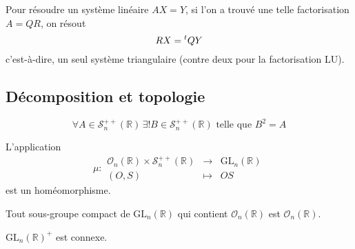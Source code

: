 	
	\begin{remark}
		Pour résoudre un système linéaire $AX = Y$, si l'on a trouvé une telle factorisation $A = QR$, on résout
		\[ RX = \mathstrut ^t QY \]
		c'est-à-dire, un seul système triangulaire (contre deux pour la factorisation LU).
	\end{remark}
	
	\subsection{Décomposition et topologie}
	
	
	\begin{lemma}
		\[ \forall A \in \mathcal{S}_n^{++}(\mathbb{R}) \, \exists! B \in \mathcal{S}_n^{++}(\mathbb{R}) \text{ telle que } B^2 = A \]
	\end{lemma}
	
	
	\begin{theorem}
		L'application
		\[ \mu :
		\begin{array}{ccc}
			\mathcal{O}_n(\mathbb{R}) \times \mathcal{S}_n^{++}(\mathbb{R}) &\rightarrow& \mathrm{GL}_n(\mathbb{R}) \\
			(O, S) &\mapsto& OS
		\end{array}
		\]
		est un homéomorphisme.
	\end{theorem}
	
	\begin{corollary}
		Tout sous-groupe compact de $\mathrm{GL}_n(\mathbb{R})$ qui contient $\mathcal{O}_n(\mathbb{R})$ est $\mathcal{O}_n(\mathbb{R})$.
	\end{corollary}
	
	
	\begin{corollary}
		$\mathrm{GL}_n(\mathbb{R})^+$ est connexe.
	\end{corollary}

